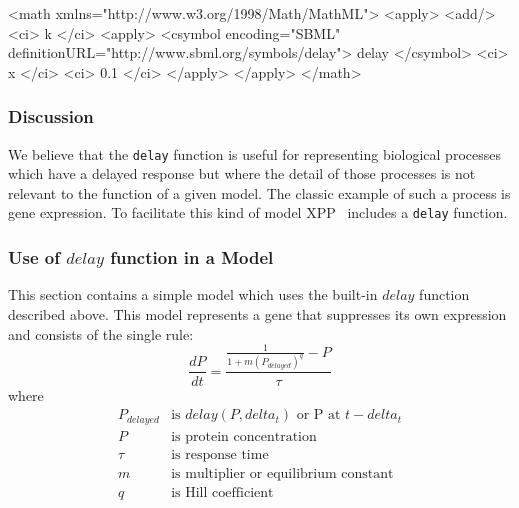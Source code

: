 \documentclass[10pt,twocolumntoc]{cekarticle}
\begin{document}
\begin{example}
<math xmlns="http://www.w3.org/1998/Math/MathML">
    <apply>
        <add/>
        <ci> k </ci>
        <apply>
            <csymbol encoding="SBML"
                        definitionURL="http://www.sbml.org/symbols/delay">
                delay
            </csymbol>
            <ci> x </ci>
            <ci> 0.1 </ci>
        </apply>
    </apply>
</math>
\end{example}

\subsubsection{Discussion}
\label{sec:delaydiscuss}
We believe that the \texttt{delay} function is useful for representing biological processes which have a delayed response but where the detail of those processes is not relevant to the function of a given model.  The classic example of such a process is gene expression.  To facilitate this kind of model XPP~\citep{ermentrout:2001} includes a \texttt{delay} function.
\subsubsection{Use of $delay$ function in a Model}
\label{sec:delayeg}
This section contains a simple model which uses the built-in $delay$ function described above.  This model represents a gene that suppresses its own expression and consists of the single rule:
\begin{equation*}
\frac{d P}{d t} = \frac{ \frac{1}{1 + m (P_{delayed})^q} - P }{ \tau }
\end{equation*}
where
\begin{equation*}
\begin{array}{rl}
P_{delayed} & \mbox{is } delay(P, delta_t) \mbox{ or P at } t - delta_t\\
P & \mbox{is protein concentration}\\
\tau & \mbox{is response time}\\
m & \mbox{is multiplier or equilibrium constant}\\
q & \mbox{is Hill coefficient}\\ 
\end{array}
\end{equation*}
\end{document}
